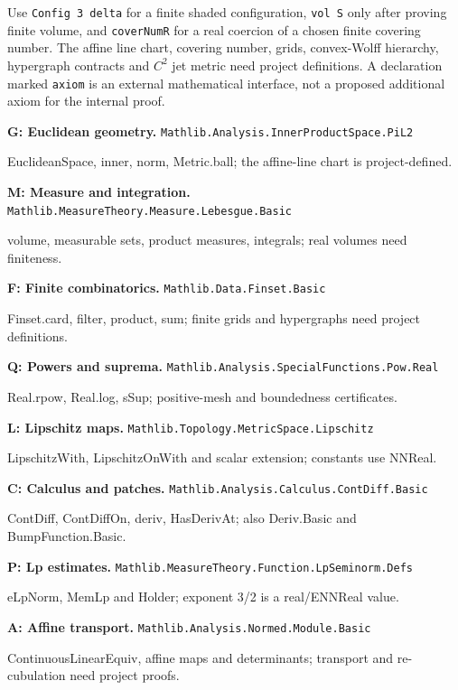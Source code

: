 \documentclass[10pt,a4paper]{article}
\newcommand{\sectitle}[1]{\clearpage{\sffamily\Large\bfseries\color{navy}#1}\par\medskip}
\begin{document}
Use \texttt{Config 3 delta} for a finite shaded configuration, \texttt{vol S} only after proving finite volume, and \texttt{coverNumR} for a real coercion of a chosen finite covering number. The affine line chart, covering number, grids, convex-Wolff hierarchy, hypergraph contracts and $C^2$ jet metric need project definitions. A declaration marked \texttt{axiom} is an external mathematical interface, not a proposed additional axiom for the internal proof.
{\footnotesize\textbf{G: Euclidean geometry.} \texttt{Mathlib.Analysis.InnerProductSpace.PiL2}\par EuclideanSpace, inner, norm, Metric.ball; the affine-line chart is project-defined.}\par
{\footnotesize\textbf{M: Measure and integration.} \texttt{Mathlib.MeasureTheory.Measure.Lebesgue.Basic}\par volume, measurable sets, product measures, integrals; real volumes need finiteness.}\par
{\footnotesize\textbf{F: Finite combinatorics.} \texttt{Mathlib.Data.Finset.Basic}\par Finset.card, filter, product, sum; finite grids and hypergraphs need project definitions.}\par
{\footnotesize\textbf{Q: Powers and suprema.} \texttt{Mathlib.Analysis.SpecialFunctions.Pow.Real}\par Real.rpow, Real.log, sSup; positive-mesh and boundedness certificates.}\par
{\footnotesize\textbf{L: Lipschitz maps.} \texttt{Mathlib.Topology.MetricSpace.Lipschitz}\par LipschitzWith, LipschitzOnWith and scalar extension; constants use NNReal.}\par
{\footnotesize\textbf{C: Calculus and patches.} \texttt{Mathlib.Analysis.Calculus.ContDiff.Basic}\par ContDiff, ContDiffOn, deriv, HasDerivAt; also Deriv.Basic and BumpFunction.Basic.}\par
{\footnotesize\textbf{P: Lp estimates.} \texttt{Mathlib.MeasureTheory.Function.LpSeminorm.Defs}\par eLpNorm, MemLp and Holder; exponent 3/2 is a real/ENNReal value.}\par
{\footnotesize\textbf{A: Affine transport.} \texttt{Mathlib.Analysis.Normed.Module.Basic}\par ContinuousLinearEquiv, affine maps and determinants; transport and re-cubulation need project proofs.}\par
\sectitle{Node index}
\end{document}
